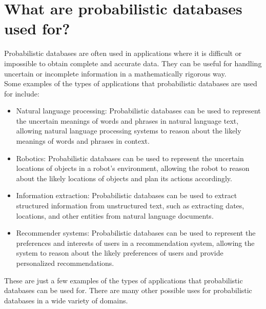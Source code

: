 \chapter{What are probabilistic databases used for?}
Probabilistic databases are often used in applications where it is difficult or impossible to obtain complete and accurate data. They can be useful for handling uncertain or incomplete information in a mathematically rigorous way.\\

\vspace{1cm}
Some examples of the types of applications that probabilistic databases are used for include:
\begin{itemize}
	\item Natural language processing: Probabilistic databases can be used to represent the uncertain meanings of words and phrases in natural language text, allowing natural language processing systems to reason about the likely meanings of words and phrases in context.
	
	\item Robotics: Probabilistic databases can be used to represent the uncertain locations of objects in a robot's environment, allowing the robot to reason about the likely locations of objects and plan its actions accordingly.
	
	\item Information extraction: Probabilistic databases can be used to extract structured information from unstructured text, such as extracting dates, locations, and other entities from natural language documents.
	
	\item Recommender systems: Probabilistic databases can be used to represent the preferences and interests of users in a recommendation system, allowing the system to reason about the likely preferences of users and provide personalized recommendations.
\end{itemize}


These are just a few examples of the types of applications that probabilistic databases can be used for. There are many other possible uses for probabilistic databases in a wide variety of domains.
